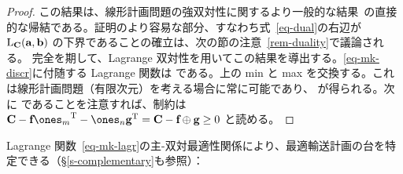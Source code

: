 \begin{proof}
この結果は、線形計画問題の強双対性に関するより一般的な結果~\citep[p. 148, Theo. 4.4]{bertsimas1997introduction}の直接的な帰結である。証明のより容易な部分、すなわち式~\eqref{eq-dual}の右辺が $\mathrm{L}_{\mathrm{\textbf{C}}}(\mathrm{\textbf{a}},\mathrm{\textbf{b}})$ の下界であることの確立は、次の節の注意~\ref{rem-duality}で議論される。
%
完全を期して、Lagrange 双対性を用いてこの結果を導出する。\eqref{eq-mk-discr}に付随する Lagrange 関数は
である。上の min と max を交換する。これは線形計画問題（有限次元）を考える場合に常に可能であり、
が得られる。次に
であることを注意すれば、制約は $\C - \fD\transp{\ones_m} - \ones_n \transp{\gD} = \C-\fD\oplus \gD \geq 0$ と読める。
\end{proof}

Lagrange 関数~\eqref{eq-mk-lagr}の主-双対最適性関係により、最適輸送計画の台を特定できる（\S\ref{s-complementary}も参照）：



